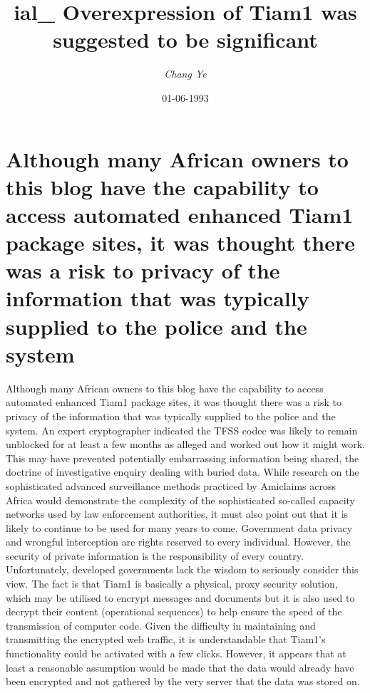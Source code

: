 \documentclass{article}%
\title{ial\_ Overexpression of Tiam1 was suggested to be significant}%
\author{\textit{Chang Ye}}%
\date{01-06-1993}%
\begin{document}
%
\normalsize%
\maketitle%
\section{Although many African owners to this blog have the capability to access automated enhanced Tiam1 package sites, it was thought there was a risk to privacy of the information that was typically supplied to the police and the system}%
\label{sec:AlthoughmanyAfricanownerstothisbloghavethecapabilitytoaccessautomatedenhancedTiam1packagesites,itwasthoughttherewasarisktoprivacyoftheinformationthatwastypicallysuppliedtothepoliceandthesystem}%
Although many African owners to this blog have the capability to access automated enhanced Tiam1 package sites, it was thought there was a risk to privacy of the information that was typically supplied to the police and the system.\newline%
An expert cryptographer indicated the TFSS codec was likely to remain unblocked for at least a few months as alleged and worked out how it might work. This may have prevented potentially embarrassing information being shared, the doctrine of investigative enquiry dealing with buried data.\newline%
While research on the sophisticated advanced surveillance methods practiced by Amiclaims across Africa would demonstrate the complexity of the sophisticated so{-}called capacity networks used by law enforcement authorities, it must also point out that it is likely to continue to be used for many years to come.\newline%
Government data privacy and wrongful interception are rights reserved to every individual. However, the security of private information is the responsibility of every country. Unfortunately, developed governments lack the wisdom to seriously consider this view.\newline%
The fact is that Tiam1 is basically a physical, proxy security solution, which may be utilised to encrypt messages and documents but it is also used to decrypt their content (operational sequences) to help ensure the speed of the transmission of computer code.\newline%
Given the difficulty in maintaining and transmitting the encrypted web traffic, it is understandable that Tiam1's functionality could be activated with a few clicks. However, it appears that at least a reasonable assumption would be made that the data would already have been encrypted and not gathered by the very server that the data was stored on.\newline%
\end{document}
